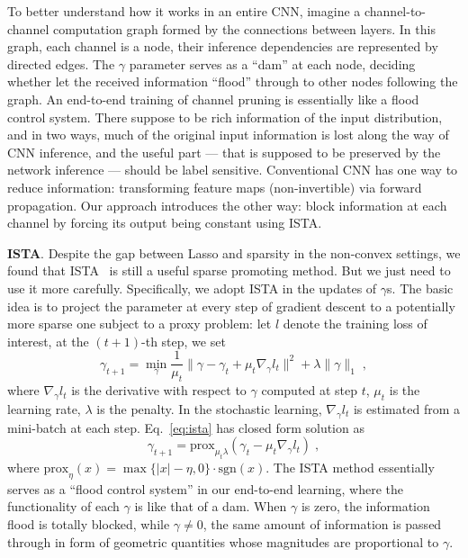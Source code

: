 \documentclass{article} %
\begin{document}
To better understand how it works in an entire CNN, imagine a channel-to-channel computation
graph formed by the connections between layers. In this graph, each channel is a node, their
inference dependencies are represented by directed edges. The $\gamma$ parameter serves as a ``dam''
at each node, deciding whether let the received information ``flood'' through to other nodes following the graph. 
An end-to-end training of channel pruning is essentially like a flood control system.
There suppose to be rich information of the input distribution, and in two ways, much of the original input information
is lost along the way of CNN inference, and the useful part --- that is supposed to be preserved by
the network inference --- should be label sensitive. Conventional CNN has one way to reduce information:
transforming feature maps (non-invertible) via forward propagation. Our approach introduces the other way:
block information at each channel by forcing its output being constant using ISTA. 

\textbf{ISTA}.
Despite the gap between Lasso and sparsity in the non-convex settings, we found that
ISTA~\citep{beck2009fast} is still a useful sparse promoting method. But we just need to use it more carefully.
Specifically, we adopt ISTA in the updates of $\gamma$s. The basic idea is to project the parameter at every step
of gradient descent to a potentially more sparse one
subject to a proxy problem: let $l$ denote the training loss of interest, at the $(t+1)$-th step, we set
\begin{equation}
\gamma_{t+1} = \min_{\gamma}\frac{1}{\mu_t} \|\gamma - \gamma_t + \mu_t\nabla_{\gamma} l_t\|^2 + \lambda \|\gamma\|_1\;,\label{eq:ista}
\end{equation}
where $\nabla_{\gamma} l_t$ is the derivative with respect to $\gamma$ computed at step $t$,
$\mu_t$ is the learning rate, $\lambda$ is the penalty. In the stochastic learning,
$\nabla_{\gamma} l_t$ is estimated from a mini-batch at each step.
Eq.~\eqref{eq:ista} has closed form solution as
\[\gamma_{t+1} = \mbox{prox}_{\mu_t\lambda} (\gamma_t - \mu_t\nabla_{\gamma} l_t)\;,\]
where $\mbox{prox}_{\eta}(x) = \max\{|x| - \eta, 0\} \cdot \mbox{sgn}(x)$.
The ISTA method essentially serves as a ``flood control system'' in our end-to-end learning, 
where the functionality of each $\gamma$ is like that of a dam. When $\gamma$ is zero, the information
flood is totally blocked, while $\gamma \neq 0$, the same amount of information is passed through in form of
geometric quantities whose magnitudes are proportional to $\gamma$. 
\end{document}
